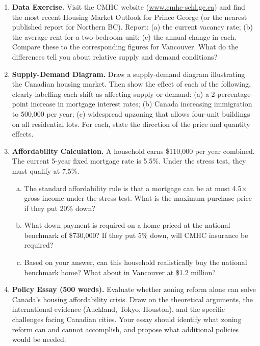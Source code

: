 \begin{enumerate}

\item \textbf{Data Exercise.} Visit the CMHC website (\url{www.cmhc-schl.gc.ca}) and find the most recent Housing Market Outlook for Prince George (or the nearest published report for Northern BC). Report: (a) the current vacancy rate; (b) the average rent for a two-bedroom unit; (c) the annual change in each. Compare these to the corresponding figures for Vancouver. What do the differences tell you about relative supply and demand conditions?

\item \textbf{Supply-Demand Diagram.} Draw a supply-demand diagram illustrating the Canadian housing market. Then show the effect of each of the following, clearly labelling each shift as affecting supply or demand: (a) a 2-percentage-point increase in mortgage interest rates; (b) Canada increasing immigration to 500,000 per year; (c) widespread upzoning that allows four-unit buildings on all residential lots. For each, state the direction of the price and quantity effects.

\item \textbf{Affordability Calculation.} A household earns \$110,000 per year combined. The current 5-year fixed mortgage rate is 5.5\%. Under the stress test, they must qualify at 7.5\%.
  \begin{enumerate}[(a)]
    \item The standard affordability rule is that a mortgage can be at most 4.5$\times$ gross income under the stress test. What is the maximum purchase price if they put 20\% down?
    \item What down payment is required on a home priced at the national benchmark of \$730,000? If they put 5\% down, will CMHC insurance be required?
    \item Based on your answer, can this household realistically buy the national benchmark home? What about in Vancouver at \$1.2 million?
  \end{enumerate}

\item \textbf{Policy Essay (500 words).} Evaluate whether zoning reform alone can solve Canada's housing affordability crisis. Draw on the theoretical arguments, the international evidence (Auckland, Tokyo, Houston), and the specific challenges facing Canadian cities. Your essay should identify what zoning reform can and cannot accomplish, and propose what additional policies would be needed.

\end{enumerate}
